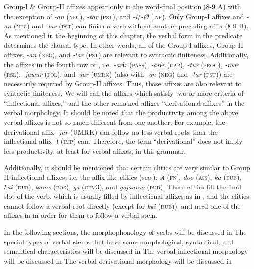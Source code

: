 Group-I \& Group-II affixes appear only in the word-final position (8-9 A) with the exception of \textit{-an} (\textsc{neg}), \textit{-tar} (\textsc{pst}), and \textit{-i}/\textit{-Ø} (\textsc{inf}). Only Group-I affixes and \textit{-an} (\textsc{neg}) and \textit{-tar} (\textsc{pst}) can finish a verb without another preceding affix (8-9 B). As mentioned in the beginning of this chapter, the verbal form in the predicate determines the clausal type. In other words, all of the Group-I affixes, Group-II affixes, \textit{-an} (\textsc{neg}), and \textit{-tar} (\textsc{pst}) are relevant to syntactic finiteness. Additionally, the affixes in the fourth row of , i.e. \textit{-arɨr} (\textsc{pass}), \textit{-arɨr} (\textsc{cap}), \textit{-tur} (\textsc{prog}), \textit{-təər} (\textsc{rsl}), \textit{-jawur} (\textsc{pol}), and \textit{-jur} (\textsc{umrk}) (also with \textit{-an} (\textsc{neg}) and \textit{-tar} (\textsc{pst})) are necessarily required by Group-II affixes. Thus, those affixes are also relevant to syntactic finiteness. We will call the affixes which satisfy two or more criteria of  “inflectional affixes,” and the other remained affixes “derivational affixes” in the verbal morphology. It should be noted that the productivity among the above verbal affixes is not so much different from one another. For example, the derivational affix \textit{-jur} (UMRK) can follow no less verbal roots than the inflectional affix \textit{-ɨ} (\textsc{imp}) can. Therefore, the term “derivational” does not imply less productivity, at least for verbal affixes, in this grammar.

  Additionally, it should be mentioned that certain clitics are very similar to Group II inflectional affixes, i.e. the affix-like clitics (see ): \textit{sɨ} (\textsc{fn}), \textit{doo} (\textsc{ass}), \textit{ka} (\textsc{dub}), \textit{kai} (\textsc{dub}), \textit{kamo} (\textsc{pos}), \textit{ga} (\textsc{cfm3}), and \textit{gajaaroo} (\textsc{dub}). These clitics fill the final slot of the verb, which is usually filled by inflectional affixes as in , and the clitics cannot follow a verbal root directly (except for \textit{kai} (\textsc{dub})), and need one of the affixes in  in order for them to follow a verbal stem.

  In the following sections, the morphophonology of verbs will be discussed in  The special types of verbal stems that have some morphological, syntactical, and semantical characteristics will be discussed in  The verbal inflectional morphology will be discussed in  The verbal derivational morphology will be discussed in 

